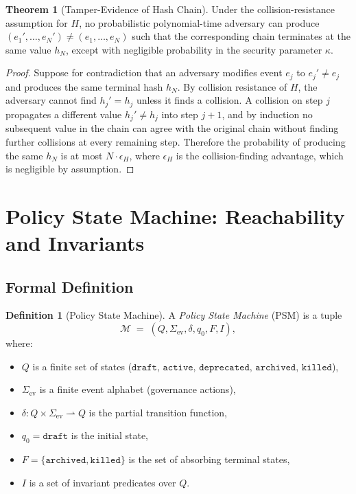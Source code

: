 \documentclass[12pt,letterpaper]{article}
\theoremstyle{definition}
\newtheorem{definition}{Definition}[section]
\newtheorem{theorem}{Theorem}[section]
\theoremstyle{remark}
\begin{document}
\begin{theorem}[Tamper-Evidence of Hash Chain]
  \label{thm:hash-tamper}
  Under the collision-resistance assumption for \(H\), no
  probabilistic polynomial-time adversary can produce
  \((e_1',\ldots,e_N') \ne (e_1,\ldots,e_N)\) such that the
  corresponding chain terminates at the same value \(h_N\), except with
  negligible probability in the security parameter \(\kappa\).
\end{theorem}

\begin{proof}
  Suppose for contradiction that an adversary modifies event \(e_j\) to
  \(e_j' \ne e_j\) and produces the same terminal hash \(h_N\).
  By collision resistance of \(H\), the adversary cannot find
  \(h_j' = h_j\) unless it finds a collision.  A collision on step \(j\)
  propagates a different value \(h_j' \ne h_j\) into step \(j+1\), and by
  induction no subsequent value in the chain can agree with the original chain
  without finding further collisions at every remaining step.  Therefore the
  probability of producing the same \(h_N\) is at most \(N \cdot \epsilon_H\),
  where \(\epsilon_H\) is the collision-finding advantage, which is negligible
  by assumption.
\end{proof}

\section{Policy State Machine: Reachability and Invariants}
\label{sec:psm}

\subsection{Formal Definition}
\label{ssec:psm-def}

\begin{definition}[Policy State Machine]
  \label{def:psm}
  A \emph{Policy State Machine} (PSM) is a tuple
  \[
    \mathcal{M} \;=\; (Q, \Sigma_{\mathrm{ev}}, \delta, q_0, F, I),
  \]
  where:
  \begin{itemize}[nosep]
    \item \(Q\) is a finite set of states
          (\(\mathtt{draft},\, \mathtt{active},\, \mathtt{deprecated},\,
          \mathtt{archived},\, \mathtt{killed}\)),
    \item \(\Sigma_{\mathrm{ev}}\) is a finite event alphabet (governance
          actions),
    \item \(\delta : Q \times \Sigma_{\mathrm{ev}} \rightharpoonup Q\) is the
          partial transition function,
    \item \(q_0 = \mathtt{draft}\) is the initial state,
    \item \(F = \{\mathtt{archived}, \mathtt{killed}\}\) is the set of
          absorbing terminal states,
    \item \(I\) is a set of invariant predicates over \(Q\).
  \end{itemize}
\end{definition}
\end{document}
